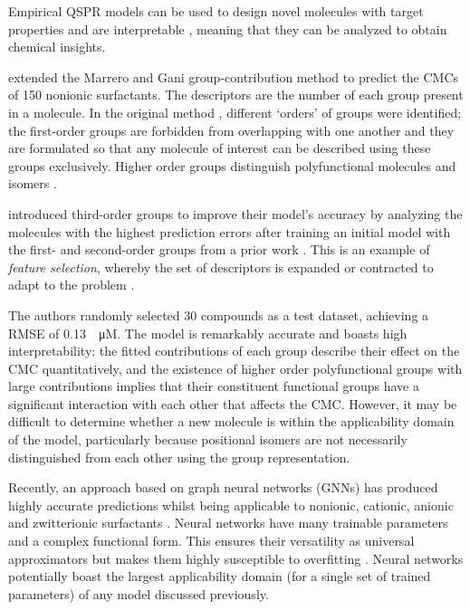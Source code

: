 Empirical QSPR models can be used to design novel molecules with target
properties
\cite{gantzerInverseQSPRNovoDesign2020,bolboacaMolecularDesignQSARs2013} and are
interpretable \cite{zefirovFragmentalApproachQSPR2002}, meaning that they can be
analyzed to obtain chemical insights.

\citet{matteiModelingCriticalMicelle2013} extended the Marrero and Gani
group-contribution method \cite{ganiAutomaticCreationMissing2005} to predict the
CMCs of 150 nonionic surfactants. The descriptors are the number of each group
present in a molecule. In the original method
\cite{ganiAutomaticCreationMissing2005}, different `orders' of groups were
identified; the first-order groups are forbidden from overlapping with one
another and they are formulated so that any molecule of interest can be
described using these groups exclusively. Higher order groups distinguish
polyfunctional molecules and isomers \cite{ganiAutomaticCreationMissing2005}.

\citet{matteiModelingCriticalMicelle2013} introduced third-order groups to
improve their model's accuracy by analyzing the molecules with the highest
prediction errors after training an initial model with the first- and
second-order groups from a prior work \cite{ganiAutomaticCreationMissing2005}.
This is an example of \emph{feature selection}, whereby the set of descriptors
is expanded or contracted to adapt to the problem
\cite{liFeatureSelectionData2017,guyonIntroductionVariableFeature2003}.

The authors randomly selected 30 compounds as a test dataset, achieving a RMSE
of \SI{0.13}{\log \micro M}. The model is remarkably accurate and boasts high
interpretability: the fitted contributions of each group describe their effect
on the CMC quantitatively, and the existence of higher order polyfunctional
groups with large contributions implies that their constituent functional groups
have a significant interaction with each other that affects the CMC. However, it
may be difficult to determine whether a new molecule is within the applicability
domain of the model, particularly because positional isomers are not necessarily
distinguished from each other using the group representation.

Recently, an approach based on graph neural networks (GNNs) has produced highly
accurate predictions whilst being applicable to nonionic, cationic, anionic and
zwitterionic surfactants \cite{qinPredictingCriticalMicelle2021}. Neural
networks have many trainable parameters and a complex functional form. This
ensures their versatility as universal approximators but makes them highly
susceptible to overfitting \cite{bejaniSystematicReviewOverfitting2021}. Neural
networks potentially boast the largest applicability domain (for a single set of
trained parameters) of any model discussed previously.


